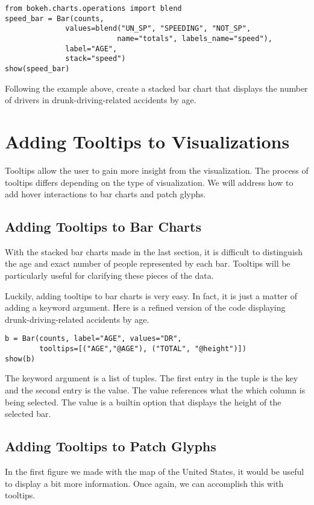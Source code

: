 \begin{lstlisting}
from bokeh.charts.operations import blend
speed_bar = Bar(counts,
              values=blend("UN_SP", "SPEEDING", "NOT_SP",
                          name="totals", labels_name="speed"),
              label="AGE",
              stack="speed")
show(speed_bar)
\end{lstlisting}

\begin{problem}
Following the example above, create a stacked bar chart that displays the
number of drivers in drunk-driving-related accidents by age.
\end{problem}

\section*{Adding Tooltips to Visualizations}
Tooltips allow the user to gain more insight from the visualization.
The process of tooltips differs depending on the type of visualization.
We will address how to add hover interactions to bar charts and patch glyphs.

\subsection*{Adding Tooltips to Bar Charts}
With the stacked bar charts made in the last section, it is difficult to
distinguish the age and exact number of people represented by each bar.
Tooltips will be  particularly useful for clarifying these pieces of the data.

Luckily, adding tooltips to bar charts is very easy. In fact, it is just a matter
of adding a keyword argument. Here is a refined version of the code displaying
drunk-driving-related accidents by age.

\begin{lstlisting}
b = Bar(counts, label="AGE", values="DR",
        tooltips=[("AGE","@AGE"), ("TOTAL", "@height")])
show(b)
\end{lstlisting}

The  keyword argument is a list of tuples. The first entry in the
tuple is the key and the second entry is the value. The value 
references what the which column is being selected. The value  is
a builtin option that displays the height of the selected bar.

\subsection*{Adding Tooltips to Patch Glyphs}
In the first figure we made with the map of the United States, it would be useful
to display a bit more information. Once again, we can accomplish this with
tooltips.
